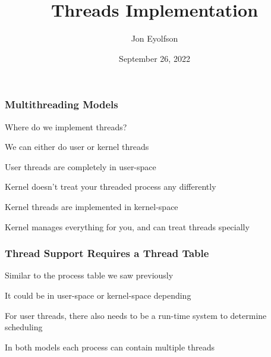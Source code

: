 

\title{Threads Implementation}
\author{Jon Eyolfson}
\date{September 26, 2022}


  \begin{frame}
    \titlepage
  \end{frame}

  \begin{frame}
    \frametitle{Multithreading Models}

    Where do we implement threads?

    \hspace{2em} We can either do user or kernel threads

    \vspace{2em}

    User threads are completely in user-space

    \hspace{2em} Kernel doesn't treat your threaded process any differently

    \vspace{2em}

    Kernel threads are implemented in kernel-space

    \hspace{2em} Kernel manages everything for you, and can treat threads specially
  \end{frame}

  \begin{frame}
    \frametitle{Thread Support Requires a Thread Table}

    Similar to the process table we saw previously

    \hspace{2em} It could be in user-space or kernel-space depending

    \vspace{2em}

    For user threads, there also needs to be a run-time system to determine
    scheduling

    \vspace{2em}

    In both models each process can contain multiple threads
  \end{frame}

